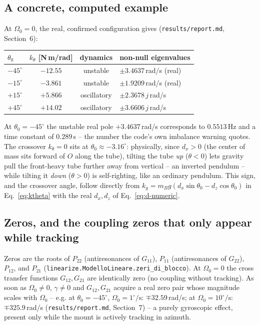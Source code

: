 \documentclass[11pt,a4paper]{article}
\numberwithin{equation}{section}
\begin{document}
\subsection{A concrete, computed example}
\label{subsec:realismo-numeri}

At $\Omega_0=0$, the real, confirmed configuration gives (\texttt{results/report.md}, Section~6):
\begin{center}
\begin{tabular}{@{}lccl@{}}
\toprule
$\theta_0$ & $k_\theta$ [N\,m/rad] & dynamics & non-null eigenvalues \\
\midrule
$-45^\circ$ & $-12.55$ & unstable & $\pm3.4637$\,rad/s (real) \\
$-15^\circ$ & $-3.861$ & unstable & $\pm1.9209$\,rad/s (real) \\
$+15^\circ$ & $+5.866$ & oscillatory & $\pm2.3678\,j$\,rad/s \\
$+45^\circ$ & $+14.02$ & oscillatory & $\pm3.6606\,j$\,rad/s \\
\bottomrule
\end{tabular}
\end{center}
At $\theta_0=-45^\circ$ the unstable real pole $+3.4637$\,rad/s corresponds to $0.5513$\,Hz and a time constant of $0.289$\,s -- the number the code's own imbalance warning quotes. The crossover $k_\theta=0$ sits at $\theta_0\approx-3.16^\circ$: physically, since $d_x>0$ (the center of mass sits forward of $O$ along the tube), tilting the tube \emph{up} ($\theta<0$) lets gravity pull the front-heavy tube further away from vertical -- an inverted pendulum -- while tilting it \emph{down} ($\theta>0$) is self-righting, like an ordinary pendulum. This sign, and the crossover angle, follow directly from $k_g = m_Bg(d_x\sin\theta_0 - d_z\cos\theta_0)$ in Eq.~\eqref{eq:ktheta} with the real $d_x,d_z$ of Eq.~\eqref{eq:d-numeric}.

\subsection{Zeros, and the coupling zeros that only appear while tracking}

Zeros are the roots of $P_{22}$ (antiresonances of $G_{11}$), $P_{11}$ (antiresonances of $G_{22}$), $P_{12}$, and $P_{21}$ (\texttt{linearize.ModelloLineare.zeri\_di\_blocco}). At $\Omega_0=0$ the cross transfer functions $G_{12},G_{21}$ are identically zero (no coupling without tracking). As soon as $\Omega_0\ne0$, $\gamma\ne0$ and $G_{12},G_{21}$ acquire a real zero pair whose magnitude scales with $\Omega_0$ -- e.g. at $\theta_0=-45^\circ$, $\Omega_0=1^\circ/\mathrm{s}$: $\mp32.59$\,rad/s; at $\Omega_0=10^\circ/\mathrm{s}$: $\mp325.9$\,rad/s (\texttt{results/report.md}, Section~7) -- a purely gyroscopic effect, present only while the mount is actively tracking in azimuth.
\end{document}
